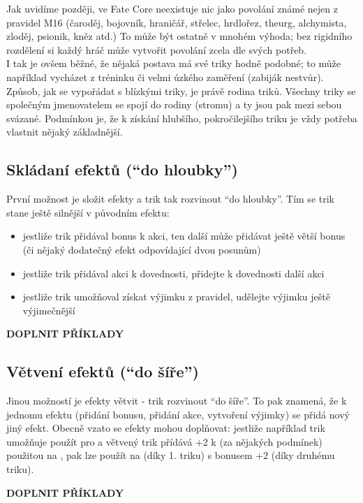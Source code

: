 Jak uvidíme později, ve Fate Core neexistuje nic jako povolání známé nejen z pravidel M16 (čaroděj, bojovník, hraničář, střelec, hrdlořez, theurg, alchymista, zloděj, psionik, kněz atd.) To může být ostatně v mnohém výhoda; bez rigidního rozdělení si každý hráč může vytvořit povolání zcela dle svých potřeb. \\
I tak je ovšem běžné, že nějaká postava má své triky hodně podobné; to může například vycházet z tréninku či velmi úzkého zaměření (zabiják nestvůr). Způsob, jak se vypořádat s blízkými triky, je právě rodina triků. Všechny triky se společným jmenovatelem se spojí do rodiny (stromu) a ty jsou pak mezi sebou svázané. Podmínkou je, že k získání hlubšího, pokročilejšího triku je vždy potřeba vlastnit nějaký základnější.

\subsection{Skládaní efektů (``do hloubky'')}
\label{sec:trik-skladani}
První možnost je složit efekty a trik tak rozvinout ``do hloubky''. Tím se trik stane ještě silnější v původním efektu:

\begin{itemize}
\item jestliže trik přidával bonus k akci, ten další může přidávat ještě větší bonus (či nějaký dodatečný efekt odpovídající dvou posunům)
\item jestliže trik přidával akci k dovednosti, přidejte k dovednosti další akci
\item jestliže trik umožňoval získat výjimku z pravidel, udělejte výjimku ještě výjimečnější
\end{itemize}

\textbf{DOPLNIT PŘÍKLADY}

\subsection{Větvení efektů (``do šíře'')}
\label{sec:trik-vetveni}
Jinou možností je efekty větvit - trik rozvinout ``do šíře''. To pak znamená, že k jednomu efektu (přidání bonusu, přidání akce, vytvoření výjimky) se přidá nový jiný efekt. Obecně vzato se efekty mohou doplňovat: jestliže například trik umožňuje použít  pro  a větvený trik přídává +2 k  (za nějakých podmínek) použitou na , pak lze použít  na  (díky 1. triku) s bonusem +2 (díky druhému triku).

\textbf{DOPLNIT PŘÍKLADY}

